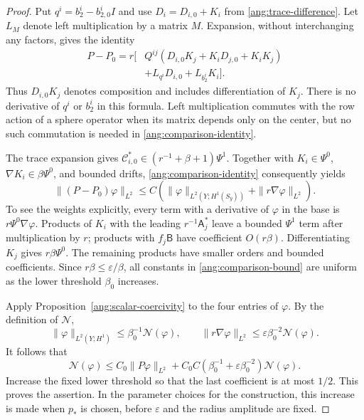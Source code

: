 \begin{proof}
Put $q^i=b_2^i-b_{2,0}^iI$ and use
$D_i=D_{i,0}+K_i$ from \eqref{ang:trace-difference}.
Let $L_M$ denote left multiplication by a matrix $M$.  Expansion, without
interchanging any factors, gives the identity
\begin{equation}\label{ang:comparison-identity}
 \begin{split}
 P-P_0=r\bigl[&Q^{ij}(D_{i,0}K_j+K_iD_{j,0}+K_iK_j)\\
              &+L_{q^i}D_{i,0}+L_{b_2^i}K_i\bigr].
 \end{split}
\end{equation}
Thus $D_{i,0}K_j$ denotes composition and includes differentiation of
$K_j$.  There is no derivative of $q^i$ or $b_2^i$ in this formula.
Left multiplication commutes with the row action of a sphere operator
when its matrix depends only on the center, but no such commutation is
needed in \eqref{ang:comparison-identity}.

The trace expansion gives
$\mathcal C_{i,0}^*\in(r^{-1}+\beta+1)\Psi^1$.
Together with $K_i\in\Psi^0$, $\nabla K_i\in\beta\Psi^0$, and bounded
drifts, \eqref{ang:comparison-identity} consequently yields
\begin{equation}\label{ang:comparison-bound}
 \|(P-P_0)\varphi\|_{L^2}
 \le C\left(\|\varphi\|_{L^2(Y;H^1(S_y))}
                         +\|r\nabla\varphi\|_{L^2}\right).
\end{equation}
To see the weights explicitly, every term with a derivative of
$\varphi$ in the base is $r\Psi^0\nabla\varphi$.
Products of $K_i$ with the leading $r^{-1}\mathsf A_j^*$ leave a bounded
$\Psi^1$ term after multiplication by $r$; products with
$f_j\mathsf B$ have coefficient $O(r\beta)$.
Differentiating $K_j$ gives $r\beta\Psi^0$.  The remaining products
have smaller orders and bounded coefficients.  Since $r\beta\le
\varepsilon/\beta$, all constants in \eqref{ang:comparison-bound}
are uniform as the lower threshold $\beta_0$ increases.

Apply Proposition~\ref{ang:scalar-coercivity} to the four entries of
$\varphi$.  By the definition of $\mathcal N$,
\[
 \|\varphi\|_{L^2(Y;H^1)}\le\beta_0^{-1}\mathcal N(\varphi),
 \qquad
 \|r\nabla\varphi\|_{L^2}
      \le\varepsilon\beta_0^{-2}\mathcal N(\varphi).
\]
It follows that
\[
 \mathcal N(\varphi)
 \le C_0\|P\varphi\|_{L^2}
   +C_0C(\beta_0^{-1}+\varepsilon\beta_0^{-2})
                                        \mathcal N(\varphi).
\]
Increase the fixed lower threshold so that the last coefficient is at
most $1/2$.  This proves the assertion.  In the parameter choices for
the construction, this increase is made when $p_*$ is chosen, before
$\varepsilon$ and the radius amplitude are fixed.
\end{proof}

